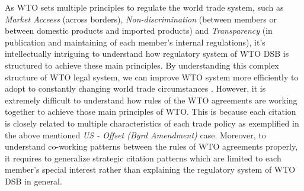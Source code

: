 As WTO sets multiple principles to regulate the world trade system, 
such as \textit{Market Acceess} (across borders), 
\textit{Non-discrimination} (between members 
or between domestic products and imported products) 
and \textit{Transparency} (in publication and maintaining 
of each member's internal regulations), 
it's intellectually intriguing 
to understand how regulatory system of WTO DSB
is structured to achieve these main principles.
By understanding this complex structure of WTO legal system, 
we can improve WTO system more efficiently 
to adopt to constantly 
changing world trade circumstances
\citep{FREDEBEULKREIN1999625, shaffer_2004, 10.1093/jiel/jgm028}.
However, it is extremely difficult to 
understand how rules of the WTO agreements are
working together to achieve those main principles of WTO. 
This is because each citation is closely related 
to multiple characteristics 
of each trade policy as exemplified in 
the above mentioned \textit{US - Offset (Byrd Amendment)} case. 
Moreover, to understand co-working patterns between the rules of WTO agreements properly, 
it requires to generalize strategic 
citation patterns which are limited 
to each member's special interest 
rather than explaining the 
regulatory system of WTO DSB in general.


